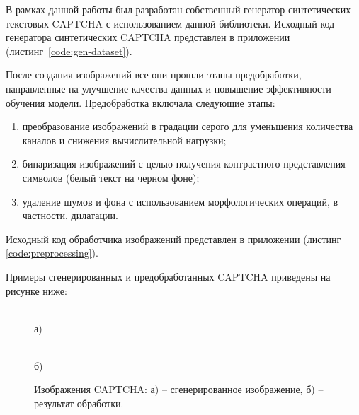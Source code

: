 В рамках данной работы был разработан собственный генератор синтетических 
текстовых CAPTCHA с использованием данной библиотеки. Исходный код генератора 
синтетических CAPTCHA представлен в приложении (листинг~\ref{code:gen-dataset}).

После создания изображений все они прошли этапы предобработки, направленные на 
улучшение качества данных и повышение эффективности обучения модели. 
Предобработка включала следующие этапы:

\begin{enumerate}
    \item преобразование изображений в градации серого для уменьшения количества 
    каналов и снижения вычислительной нагрузки;
    \item бинаризация изображений с целью получения контрастного представления 
    символов (белый текст на черном фоне);
    \item удаление шумов и фона с использованием морфологических операций, в 
    частности, дилатации.
\end{enumerate}

Исходный код обработчика изображений представлен в приложении (листинг~
\ref{code:preprocessing}).

Примеры сгенерированных и предобработанных CAPTCHA приведены на рисунке ниже:

\begin{figure}[H]
    \centering
    \begin{minipage}[h]{0.45\linewidth}
        \\ а)
    \end{minipage}
    \begin{minipage}[h]{0.45\linewidth}
        \\ б)
    \end{minipage}
    \caption{Изображения CAPTCHA: а) -- сгенерированное изображение, б) -- 
    результат обработки.}
    \label{fig:example-captcha}
\end{figure}

